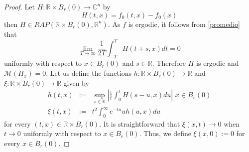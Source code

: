\documentclass[english,reqno]{amsart}
\numberwithin{equation}{section}
\theoremstyle{plain}
\theoremstyle{definition}
\theoremstyle{remark}
\newcommand{\bb}[1]{{\mathbb{#1}}}
\begin{document}
\begin{proof}
Let $H:\bb{R}\times B_{r}(0)\rightarrow \bb{C}^n$ by
$$H(t,x)=f_0 (t,x)-f_0 (x)$$
then $H\in RAP(\bb{R}\times B_{r}(0),\bb{R}^n)$. As $f$ is ergodic, it follows from \eqref{promedio} that
$$\lim_{T\rightarrow \infty}\frac{1}{2T}\int_{-T}^{T} H(t+s,x)dt =0$$
uniformly with respect to $x\in B_{r}(0)$ and $s\in \bb{R}$. Therefore $H$ is ergodic and $\mathcal{M}(H_x)=0$. 
Let us define the functions $h:\bb{R}\times B_{r}(0)\rightarrow \mathbb{R}$ and $\xi:\bb{R}\times B_{r}(0)\rightarrow \mathbb{R}$ given by
\begin{eqnarray*}
h(t,x)&:=&\sup_{s\in\bb{R}}\left\vert \frac{1}{t}\int_{0}^{t}H(s-u,x)du\right\vert \,\, x\in B_{r}(0)\\
\xi(t,x)&:=&t^2\int_{0}^{\infty} e^{-tu}u h(u,x)du
\end{eqnarray*}
for every $(t,x)\in\bb{R}\times B_{r}(0)$. It is straightforward that $\xi(x,t)\rightarrow 0$ when $t\rightarrow 0$ uniformly with respect to $x\in B_{r}(0)$. Thus, we define $\xi(x,0):=0$ for every $x\in B_{r}(0)$.


\end{proof}
\end{document}
